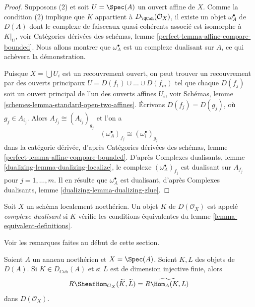 \begin{proof}
Supposons (2) et soit $U = \Spec(A)$ un ouvert affine de $X$. Comme la condition (2) implique que $K$ appartient à $D_\QCoh(\mathcal{O}_X)$, il existe un objet $\omega_A^\bullet$ de $D(A)$ dont le complexe de faisceaux quasi-cohérents associé est isomorphe à $K|_U$, voir Catégories dérivées des schémas, lemme \ref{perfect-lemma-affine-compare-bounded}. Nous allons montrer que $\omega_A^\bullet$ est un complexe dualisant sur $A$, ce qui achèvera la démonstration.

\medskip\noindent
Puisque $X = \bigcup U_i$ est un recouvrement ouvert, on peut trouver un recouvrement par des ouverts principaux $U = D(f_1) \cup \ldots \cup D(f_m)$ tel que chaque $D(f_j)$ soit un ouvert principal de l'un des ouverts affines $U_i$, voir Schémas, lemme \ref{schemes-lemma-standard-open-two-affines}. Écrivons $D(f_j) = D(g_j)$, où $g_j \in A_{i_j}$. Alors $A_{f_j} \cong (A_{i_j})_{g_j}$ et l'on a
$$
(\omega_A^\bullet)_{f_j} \cong (\omega_i^\bullet)_{g_j}
$$
dans la catégorie dérivée, d'après Catégories dérivées des schémas, lemme \ref{perfect-lemma-affine-compare-bounded}. D'après Complexes dualisants, lemme \ref{dualizing-lemma-dualizing-localize}, le complexe $(\omega_A^\bullet)_{f_j}$ est dualisant sur $A_{f_j}$ pour $j = 1, \ldots, m$. Il en résulte que $\omega_A^\bullet$ est dualisant, d'après Complexes dualisants, lemme \ref{dualizing-lemma-dualizing-glue}.
\end{proof}

\begin{definition}
\label{definition-dualizing-scheme}
Soit $X$ un schéma localement noethérien. Un objet $K$ de $D(\mathcal{O}_X)$ est appelé {\it complexe dualisant} si $K$ vérifie les conditions équivalentes du lemme \ref{lemma-equivalent-definitions}.
\end{definition}

\noindent
Voir les remarques faites au début de cette section.

\begin{lemma}
\label{lemma-affine-duality}
Soient $A$ un anneau noethérien et $X = \Spec(A)$. Soient $K, L$ des objets de $D(A)$. Si $K \in D_{\textit{Coh}}(A)$ et si $L$ est de dimension injective finie, alors
$$
R\SheafHom_{\mathcal{O}_X}(\widetilde{K}, \widetilde{L})
=
\widetilde{R\Hom_A(K, L)}
$$
dans $D(\mathcal{O}_X)$.
\end{lemma}

